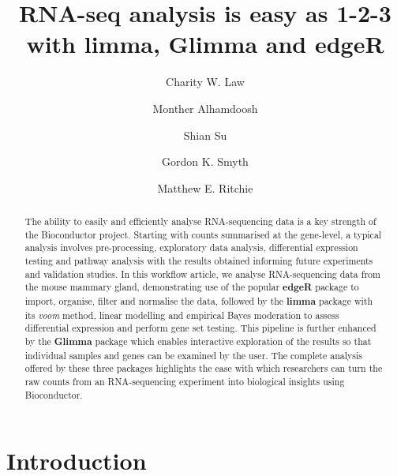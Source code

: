 \documentclass[10pt,a4paper]{extarticle}\usepackage[]{graphicx}\usepackage[]{color}
\begin{document}
\pagestyle{fancy}

\title{RNA-seq analysis is easy as 1-2-3 with limma, Glimma and edgeR}

\author[1,2]{Charity W. Law}
\author[3]{Monther Alhamdoosh}
\author[1]{Shian Su}
\author[1,4,*]{Gordon K. Smyth}
\author[1,2,4,*]{Matthew E. Ritchie}


\maketitle
\thispagestyle{fancy}


\begin{abstract}
The ability to easily and efficiently analyse RNA-sequencing data is a key strength of the Bioconductor project.
Starting with counts summarised at the gene-level, a typical analysis involves pre-processing, exploratory data analysis, differential expression testing and pathway analysis with the results obtained informing future experiments and validation studies. 
In this workflow article, we analyse RNA-sequencing data from the mouse mammary gland, demonstrating use of the popular \textbf{edgeR} package to import, organise, filter and normalise the data, followed by the \textbf{limma} package with its {\it voom} method, linear modelling and empirical Bayes moderation to assess differential expression and perform gene set testing. This pipeline is further enhanced by the \textbf{Glimma} package which enables interactive exploration of the results so that individual samples and genes can be examined by the user.
The complete analysis offered by these three packages highlights the ease with which researchers can turn the raw counts from an RNA-sequencing experiment into biological insights using Bioconductor.
\end{abstract}

\clearpage

\section*{Introduction}
\end{document}
